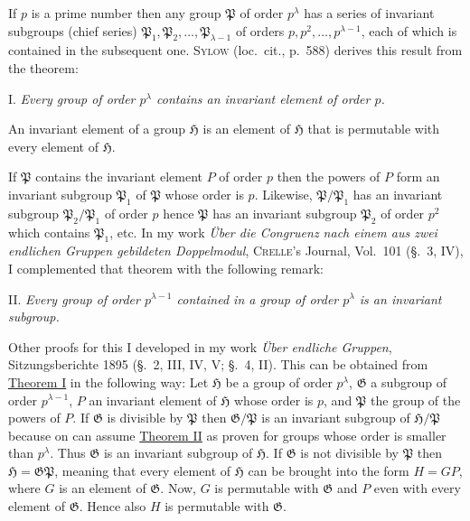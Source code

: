 \documentclass[a5paper,12pt]{article}
\let\fr\mathfrak
\newcommand{\CG}{\fr{G}}
\newcommand{\CH}{\fr{H}}
\newcommand{\CP}{\fr{P}}
\newcommand{\?}{{\color{blue}${}^{(?)}$}}
\newcounter{origpagecounter}{}
\newcommand{\origpagebreak}{\mark{\arabic{origpagecounter}}\addtocounter{origpagecounter}{1}\mark{\arabic{origpagecounter}}}
\begin{document}
If $p$ is a prime number
then any group $\CP$ of order $p^\lambda$
has
a series of invariant subgroups (chief series)
$\CP_1, \CP_2, \ldots, \CP_{\lambda-1}$
of orders
$p, p^2, \ldots, p^{\lambda-1}$,
each of which is contained in the subsequent one.
%
%
\textsc{Sylow} (loc.~cit., p.~588) derives this result 
from the theorem:


I.
%
\label{t:1-1}
%
\emph{ %
Every group of order $p^\lambda$ contains
an invariant element of order $p$.
}


An invariant element of a group $\CH$
is an element of $\CH$
that
is permutable with every element of $\CH$.
%
\origpagebreak
%
If $\CP$ contains 
the invariant element $P$ of order $p$
then
the powers
of $P$ form
an invariant subgroup $\CP_1$ of $\CP$
whose order is $p$.
%
%
Likewise,
$\CP / \CP_1$ has 
an invariant subgroup $\CP_2 / \CP_1$ of order $p$
hence
$\CP$ has an invariant subgroup $\CP_2$ of order $p^2$
which contains $\CP_1$, etc.
%
%
In my work
\emph{\"Uber die Congruenz nach einem aus zwei endlichen Gruppen gebildeten Doppelmodul},
\textsc{Crelle}'s Journal, Vol.~101
(\S.~3, IV), 
I complemented
that theorem with the following remark:


II.
%
\label{t:1-2}
%
\emph{ %
Every group of order $p^{\lambda-1}$ 
contained in a group of order $p^\lambda$
is an invariant subgroup.
}


Other proofs for this
I developed 
in my work
\emph{\"Uber endliche Gruppen},
Sit\-zungs\-be\-richte 1895
(\S.~2, III, IV, V; \S.~4, II).
%
%
This can be obtained from 
\hyperref[t:1-1]{Theorem I}
in the following way:
%
%
Let
$\CH$ be a group of order $p^\lambda$,
$\CG$ a subgroup of order $p^{\lambda-1}$,
$P$ an invariant element of $\CH$
whose order is $p$,
and
$\CP$ the group of the powers of 
$P$. %
%
%
If $\CG$ is divisible by $\CP$
then
$\CG / \CP$ 
is an invariant subgroup of $\CH / \CP$
because
on can assume 
\hyperref[t:1-2]{Theorem II}
as proven
for groups whose order is smaller than $p^\lambda$.
%
%
Thus $\CG$ is an invariant subgroup of $\CH$.
%
%
If $\CG$ is not divisible by $\CP$
then $\CH = \CG \CP$,
meaning that
every element of $\CH$
can be brought into the form $H = G P$,
where $G$ is an element of $\CG$.
%
%
Now,
$G$ is permutable with $\CG$
and
$P$ even with every element of $\CG$.
%
%
Hence
also $H$ is permutable with $\CG$.
\end{document}
